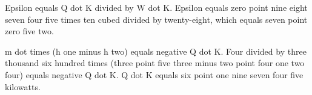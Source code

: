 Epsilon equals Q dot K divided by W dot K.  
Epsilon equals zero point nine eight seven four five times ten cubed divided by twenty-eight, which equals seven point zero five two.  

m dot times (h one minus h two) equals negative Q dot K.  
Four divided by three thousand six hundred times (three point five three minus two point four one two four) equals negative Q dot K.  
Q dot K equals six point one nine seven four five kilowatts.